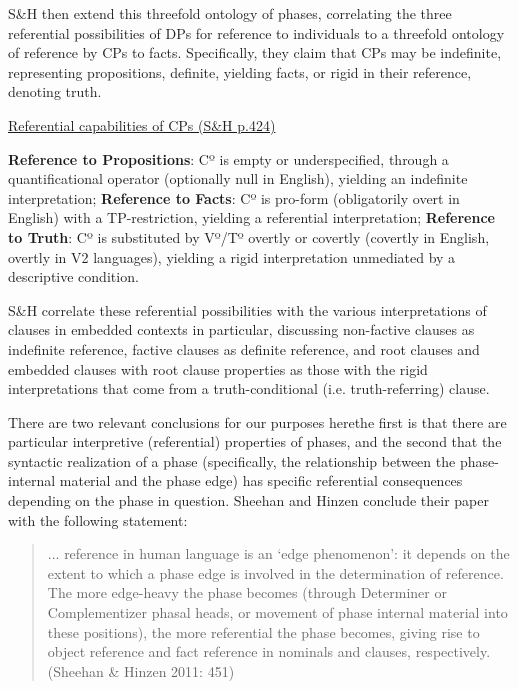 S\&H then extend this threefold ontology of phases, correlating the three referential possibilities of DPs for reference to individuals to a threefold ontology of reference by CPs to facts. Specifically, they claim that CPs may be indefinite, representing propositions, definite, yielding facts, or rigid in their reference, denoting truth. 

\ea \underline{Referential capabilities of CPs (S\&H p.424)} \\

\begin{xlist}
\ex \textbf{Reference to Propositions}: Cº is empty or underspecified, through a quantificational operator (optionally null in English), yielding an indefinite interpretation; 
\ex \textbf{Reference to Facts}: Cº is pro-form (obligatorily overt in English) with a TP-restriction, yielding a referential interpretation;
\ex \textbf{Reference to Truth}: Cº is substituted by Vº/Tº overtly or covertly (covertly in English, overtly in V2 languages), yielding a rigid interpretation unmediated by a descriptive condition.
\end{xlist}
\z

S\&H correlate these referential possibilities with the various interpretations of clauses in embedded contexts in particular, discussing non-factive clauses as indefinite reference, factive clauses as definite reference, and root clauses and embedded clauses with root clause properties as those with the rigid interpretations that come from a truth-conditional (i.e. truth-referring) clause. 

There are two relevant conclusions for our purposes here\textemdash the first is that there are particular interpretive (referential) properties of phases, and the second that the syntactic realization of a phase (specifically, the relationship between the phase-internal material and the phase edge) has specific referential consequences depending on the phase in question. Sheehan and Hinzen conclude their paper with the following statement: 

\begin{quote}

 ... reference in human language is an `edge phenomenon': it depends on the extent to which a phase edge is involved in the determination of reference. The more edge-heavy the phase becomes (through Determiner or Complementizer phasal heads, or movement of phase internal material into these positions), the more referential the phase becomes, giving rise to object reference and fact reference in nominals and clauses, respectively. (Sheehan \& Hinzen 2011: 451)

\end{quote}

